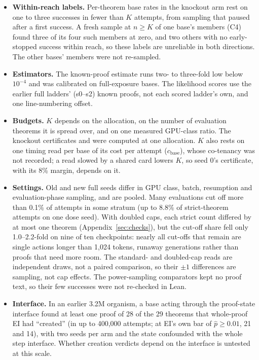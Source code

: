 \begin{itemize}
others the bases sit at the sampling floor.
\item \textbf{Within-reach labels.} Per-theorem base rates in the knockout arm rest on one to three successes in fewer
than $K$ attempts, from sampling that paused after a first success. A fresh sample at $n \geq K$ of one base's members
(C4) found three of its four such members at zero, and two others with no early-stopped success within reach, so
these labels are unreliable in both directions. The other bases' members were not
re-sampled.
\item \textbf{Estimators.} The known-proof estimate runs two- to three-fold low below $10^{-4}$ and was calibrated on
full-exposure bases. The likelihood scores use the earlier full ladders' (s0--s2) known proofs, not each scored ladder's own,
and one line-numbering offset.
\item \textbf{Budgets.} $K$ depends on the allocation, on the number of evaluation theorems it is spread over, and on
one measured GPU-class ratio. The knockout certificates and \dcov{} were computed at one allocation. $K$ also
rests on one timing read per base of its cost per attempt ($c_{\mathrm{base}}$), whose co-tenancy was not recorded; a
read slowed by a shared card lowers $K$, so seed 0's certificate, with its 8\% margin, depends on it.
\item \textbf{Settings.} Old and new full seeds differ in GPU class, batch, resumption and evaluation-phase sampling,
and are pooled. Many evaluations cut off more than 0.1\% of attempts in some stratum (up to 8.8\% of strict-theorem
attempts on one dose seed). With doubled caps, each strict count differed by at most one theorem (Appendix~\ref{sec:checks}), but the
cut-off share fell only 1.0--2.2-fold on nine of ten checkpoints: nearly all cut-offs that remain are single actions longer
than 1,024 tokens, runaway generations rather than proofs that need more room. The standard- and doubled-cap reads are
independent draws, not a paired comparison, so their $\pm1$ differences are sampling, not cap effects. The power-sampling comparators kept no proof text, so
their few successes were not re-checked in Lean.
\item \textbf{Interface.} In an earlier 3.2M organism, a base acting through the proof-state interface found at
least one proof of 28 of the 29 theorems that whole-proof EI had ``created'' (in up to 400,000 attempts; at EI's own
bar of $\hat p \geq 0.01$, 21 and 14), with two seeds per arm and the state confounded with the whole step interface. Whether creation verdicts depend on the interface is untested at this scale.
\end{itemize}
